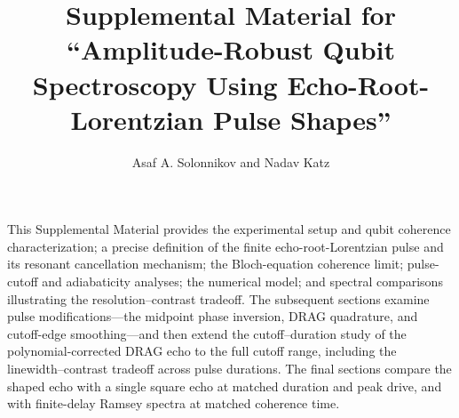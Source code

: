 \documentclass[
    amsfonts,
    amssymb,
    amsmath,
    reprint,
    floatfix,
    nofootinbib,
    aps,
    prl
]{revtex4-2}
\begin{document}
\title{\texorpdfstring{Supplemental Material for\\
``Amplitude-Robust Qubit Spectroscopy Using Echo-Root-Lorentzian Pulse Shapes''}
{Supplemental Material for Amplitude-Robust Qubit Spectroscopy Using Echo-Root-Lorentzian Pulse Shapes}}

\author{Asaf A. Solonnikov and Nadav Katz}

\maketitle
\raggedbottom

\setcounter{secnumdepth}{2}

This Supplemental Material provides the experimental setup and qubit coherence
characterization; a precise definition of the finite echo-root-Lorentzian
pulse and its resonant cancellation mechanism; the Bloch-equation coherence
limit; pulse-cutoff and adiabaticity analyses; the numerical model; and
spectral comparisons illustrating the resolution--contrast tradeoff.
The subsequent sections examine pulse modifications---the midpoint phase
inversion, DRAG quadrature, and cutoff-edge smoothing---and then extend the
cutoff--duration study of the polynomial-corrected DRAG echo to the full
cutoff range, including the linewidth--contrast tradeoff across pulse durations.
The final sections compare the shaped echo with a single square echo at
matched duration and peak drive, and with finite-delay Ramsey spectra at
matched coherence time.

\renewcommand{\thesection}{S\arabic{section}}
\renewcommand{\thesubsection}{S\arabic{section}.\arabic{subsection}}
\renewcommand{\theequation}{S\arabic{equation}}
\renewcommand{\thefigure}{S\arabic{figure}}
\renewcommand{\thetable}{S\arabic{table}}








% 
% 






\end{document}
